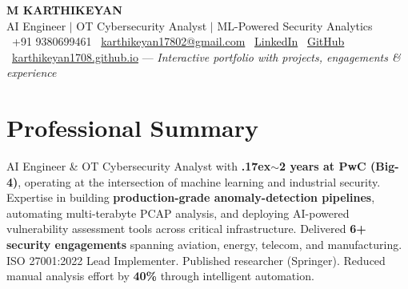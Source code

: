 \documentclass[10.5pt,a4paper]{article}
\begin{document}
\begin{center}
{\LARGE \textbf{M KARTHIKEYAN}}\\[3pt]
{\normalsize AI Engineer \(\mid\) OT Cybersecurity Analyst \(\mid\) ML-Powered Security Analytics}\\[5pt]
\faPhone\ +91 9380699461 \quad
\faEnvelope\ \href{mailto:karthikeyan17802@gmail.com}{karthikeyan17802@gmail.com} \quad
\faLinkedin\ \href{https://www.linkedin.com/in/karthikeyan-m-10a35a242/}{LinkedIn} \quad
\faGithub\ \href{https://github.com/karthikeyan1708}{GitHub}\\[3pt]
\faGlobe\ \href{https://karthikeyan1708.github.io}{\textcolor{linkblue}{karthikeyan1708.github.io}} — \textit{Interactive portfolio with projects, engagements \& experience}
\end{center}

\section{Professional Summary}
AI Engineer \& OT Cybersecurity Analyst with \textbf{{\raise.17ex\hbox{$\scriptstyle\sim$}}2 years at PwC (Big-4)}, operating at the intersection of machine learning and industrial security. Expertise in building \textbf{production-grade anomaly-detection pipelines}, automating multi-terabyte PCAP analysis, and deploying AI-powered vulnerability assessment tools across critical infrastructure. Delivered \textbf{6+ security engagements} spanning aviation, energy, telecom, and manufacturing. ISO 27001:2022 Lead Implementer. Published researcher (Springer). Reduced manual analysis effort by \textbf{40\%} through intelligent automation.

\end{document}
